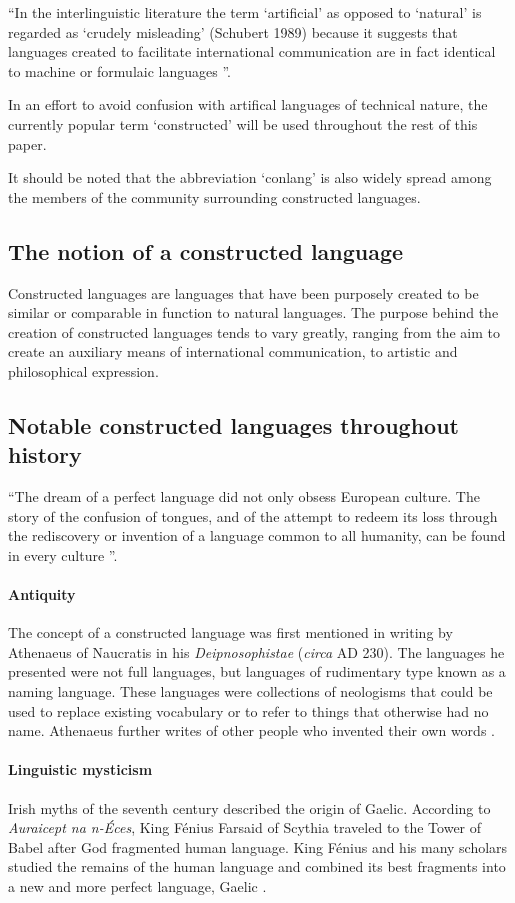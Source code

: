 \documentclass[14pt, a4paper]{extreport}
\begin{document}
``In the interlinguistic literature the term `artificial' as opposed to `natural' is regarded as `crudely misleading' (Schubert 1989) because it suggests that languages created to facilitate international communication are in fact identical to machine or formulaic languages \parencite[45]{stria}''.

In an effort to avoid confusion with artifical languages of technical nature, the currently popular term `constructed' will be used throughout the rest of this paper.

It should be noted that the abbreviation `conlang' is also widely spread among the members of the community surrounding constructed languages.
\subsection{The notion of a constructed language}
Constructed languages are languages that have been purposely created to be similar or comparable in function to natural languages. The purpose behind the creation of constructed languages tends to vary greatly, ranging from the aim to create an auxiliary means of international communication, to artistic and philosophical expression.
    \subsection{Notable constructed languages throughout history}
``The dream of a perfect language did not only obsess European culture. The story of the confusion of tongues, and of the attempt to redeem its loss through the rediscovery or invention of a language common to all humanity, can be found in every culture \parencite[1]{eco}''.
        \paragraph{Antiquity}
The concept of a constructed language was first mentioned in writing by Athenaeus of Naucratis in his \textit{Deipnosophistae} (\textit{circa} \textsc{AD} 230). The languages he presented were not full languages, but languages of rudimentary type known as a naming language. These languages were collections of neologisms that could be used to replace existing vocabulary or to refer to things that otherwise had no name. Athenaeus further writes of other people who invented their own words \parencite{sanders}.
        \paragraph{Linguistic mysticism}
Irish myths of the seventh century described the origin of Gaelic. According to \textit{Auraicept na n-Éces}, King Fénius Farsaid of Scythia traveled to the Tower of Babel after God fragmented human language. King Fénius and his many scholars studied the remains of the human language and combined its best fragments into a new and more perfect language, Gaelic \parencite{williams}.
\end{document}
